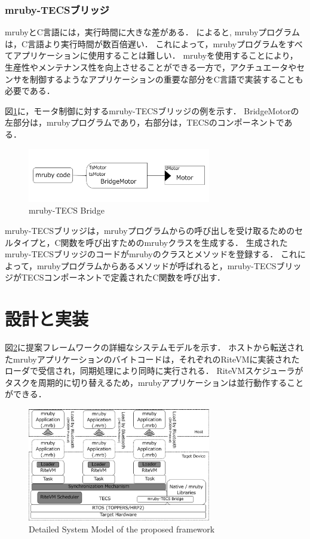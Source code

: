 \documentclass[submit]{ipsj_v2/UTF8/ipsj}
\begin{document}
\subsubsection{mruby-TECSブリッジ}
mrubyとC言語には，実行時間に大きな差がある．
\cite{par:mrubyonTECS}によると, mrubyプログラムは，C言語より実行時間が数百倍遅い．
これによって，mrubyプログラムをすべてアプリケーションに使用することは難しい．
mrubyを使用することにより，生産性やメンテナンス性を向上させることができる一方で，アクチュエータやセンサを制御するようなアプリケーションの重要な部分をC言語で実装することも必要である．

図\ref{fig:mruby_TECS_bridge}に，モータ制御に対するmruby-TECSブリッジの例を示す．
BridgeMotorの左部分は，mrubyプログラムであり，右部分は，TECSのコンポーネントである．
\begin{figure}[t]
    \centering
    \includegraphics[width=8cm,clip]{../EMSOFT2016/figure/mruby_TECS_bridge.pdf}
    \caption{mruby-TECS Bridge}
    \label{fig:mruby_TECS_bridge}
\end{figure}

mruby-TECSブリッジは，mrubyプログラムからの呼び出しを受け取るためのセルタイプと，C関数を呼び出すためのmrubyクラスを生成する．
生成されたmruby-TECSブリッジのコードがmrubyのクラスとメソッドを登録する．
これによって，mrubyプログラムからあるメソッドが呼ばれると，mruby-TECSブリッジがTECSコンポーネントで定義されたC関数を呼び出す．

\section{設計と実装}
\label{sec:Design and Implementation}
図\ref{fig:system_model}に提案フレームワークの詳細なシステムモデルを示す．
ホストから転送されたmrubyアプリケーションのバイトコードは，それぞれのRiteVMに実装されたローダで受信され，同期処理により同時に実行される．
RiteVMスケジューラがタスクを周期的に切り替えるため，mrubyアプリケーションは並行動作することができる．
　
\begin{figure}[t]
    \centering
    \includegraphics[width=8cm,clip]{../EMSOFT2016/figure/system_model.pdf}
    \caption{Detailed System Model of the proposed framework}
    \label{fig:system_model}
\end{figure}
\end{document}
